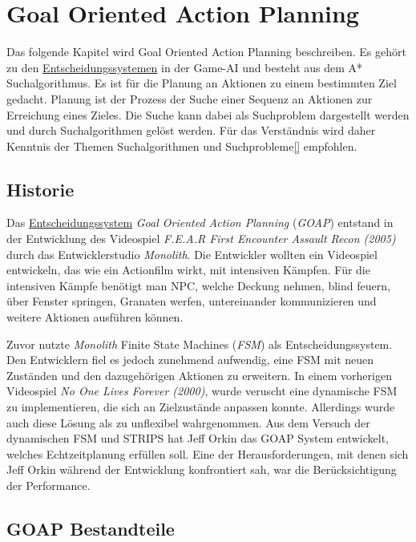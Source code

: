 \chapter{Goal Oriented Action Planning}
\label{chap:goap}

Das folgende Kapitel wird Goal Oriented Action Planning beschreiben. Es gehört zu den \hyperref[chap:entscheidungssysteme]{Entscheidungssystemen} in der Game-AI und besteht aus dem A* Suchalgorithmus. Es ist für die Planung an Aktionen zu einem bestimmten Ziel gedacht. Planung ist der Prozess der Suche einer Sequenz an Aktionen zur Erreichung eines Zieles. Die Suche kann dabei als Suchproblem dargestellt werden und durch Suchalgorithmen gelöst werden. Für das Verständnis wird daher Kenntnis der Themen Suchalgorithmen und Suchprobleme\ref{} empfohlen.

\section{Historie}
\label{chap:goap historie}

Das \hyperref[chap:entscheidungssysteme]{Entscheidungssystem} \textit{Goal Oriented Action Planning} (\textit{GOAP}) entstand in der Entwicklung des Videospiel \textit{F.E.A.R First Encounter Assault Recon (2005)} durch das Entwicklerstudio \textit{Monolith}. Die Entwickler wollten ein Videospiel entwickeln, das wie ein Actionfilm wirkt, mit intensiven Kämpfen. Für die intensiven Kämpfe benötigt man NPC, welche Deckung nehmen, blind feuern, über Fenster springen, Granaten werfen, untereinander kommunizieren und weitere Aktionen ausführen können.

Zuvor nutzte \textit{Monolith} Finite State Machines (\textit{FSM}) als Entscheidungssystem. Den Entwicklern fiel es jedoch zunehmend aufwendig, eine FSM mit neuen Zuständen und den dazugehörigen Aktionen zu erweitern. In einem vorherigen Videospiel \textit{No One Lives Forever (2000)}, wurde veruscht eine dynamische FSM zu implementieren, die sich an Zielzustände anpassen konnte. Allerdings wurde auch diese Lösung als zu unflexibel wahrgenommen. Aus dem Versuch der dynamischen FSM und STRIPS hat Jeff Orkin das GOAP System entwickelt, welches Echtzeitplanung erfüllen soll. Eine der Herausforderungen, mit denen sich Jeff Orkin während der Entwicklung konfrontiert sah, war die Berücksichtigung der Performance.\autocite{retro_fear}



\section{GOAP Bestandteile}
\label{chap:goap bestandteile}

